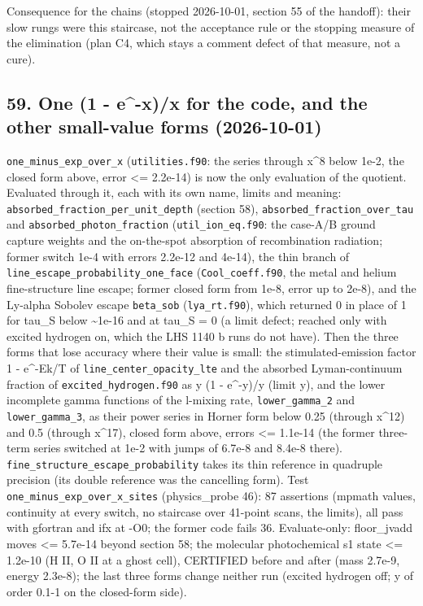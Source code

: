\documentclass[english,a4paper]{my_memo}
\begin{document}
Consequence for the chains (stopped 2026-10-01, section 55 of the handoff):
their slow rungs were this staircase, not the acceptance rule or the
stopping measure of the elimination (plan C4, which stays a comment defect
of that measure, not a cure).

\subsection{59. One (1 - e\^{}-x)/x for the code, and the other small-value forms (2026-10-01)}\label{59-one-1---e-xx-for-the-code-and-the-other-small-value-forms-2026-10-01}

\texttt{one\_minus\_exp\_over\_x} (\texttt{utilities.f90}: the series through x\^{}8 below 1e-2,
the closed form above, error \textless= 2.2e-14) is now the only evaluation of the
quotient. Evaluated through it, each with its own name, limits and meaning:
\texttt{absorbed\_fraction\_per\_unit\_depth} (section 58), \texttt{absorbed\_fraction\_over\_tau}
and \texttt{absorbed\_photon\_fraction} (\texttt{util\_ion\_eq.f90}: the case-A/B ground
capture weights and the on-the-spot absorption of recombination radiation;
former switch 1e-4 with errors 2.2e-12 and 4e-14), the thin branch of
\texttt{line\_escape\_probability\_one\_face} (\texttt{Cool\_coeff.f90}, the metal and helium
fine-structure line escape; former closed form from 1e-8, error up to
2e-8), and the Ly-alpha Sobolev escape \texttt{beta\_sob} (\texttt{lya\_rt.f90}), which
returned 0 in place of 1 for tau\_S below \textasciitilde1e-16 and at tau\_S = 0 (a limit
defect; reached only with excited hydrogen on, which the LHS 1140 b runs do
not have). Then the three forms that lose accuracy where their value is
small: the stimulated-emission factor 1 - e\^{}-Ek/T of
\texttt{line\_center\_opacity\_lte} and the absorbed Lyman-continuum fraction of
\texttt{excited\_hydrogen.f90} as y (1 - e\^{}-y)/y (limit y), and the lower
incomplete gamma functions of the l-mixing rate, \texttt{lower\_gamma\_2} and
\texttt{lower\_gamma\_3}, as their power series in Horner form below 0.25 (through
x\^{}12) and 0.5 (through x\^{}17), closed form above, errors \textless= 1.1e-14 (the
former three-term series switched at 1e-2 with jumps of 6.7e-8 and 8.4e-8
there). \texttt{fine\_structure\_escape\_probability} takes its thin reference in
quadruple precision (its double reference was the cancelling form).
Test \texttt{one\_minus\_exp\_over\_x\_sites} (physics\_probe 46): 87 assertions
(mpmath values, continuity at every switch, no staircase over 41-point
scans, the limits), all pass with gfortran and ifx at -O0; the former code
fails 36. Evaluate-only: floor\_jvadd moves \textless= 5.7e-14 beyond section 58;
the molecular photochemical s1 state \textless= 1.2e-10 (H II, O II at a ghost
cell), CERTIFIED before and after (mass 2.7e-9, energy 2.3e-8); the last
three forms change neither run (excited hydrogen off; y of order 0.1-1 on
the closed-form side).
\end{document}
